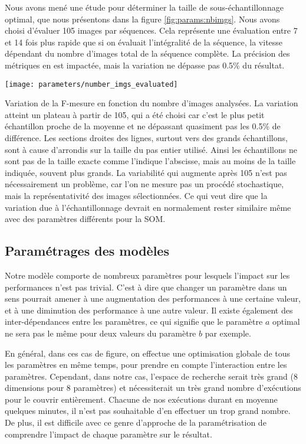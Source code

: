 	Nous avons mené une étude pour déterminer la taille de sous-échantillonnage optimal, que nous présentons dans la figure \ref{fig:params:nbimgs}. Nous avons choisi d'évaluer 105 images par séquences. Cela représente une évaluation entre 7 et 14 fois plus rapide que si on évaluait l'intégralité de la séquence, la vitesse dépendant du nombre d'images total de la séquence complète. La précision des métriques en est impactée, mais la variation ne dépasse pas 0.5\% du résultat.

	\begin{figureth}
		\texttt{[image: parameters/number\_imgs\_evaluated]}
		\caption[Échantillonnage de l'évaluation]{Variation de la F-mesure en fonction du nombre d'images analysées. La variation atteint un plateau à partir de 105, qui a été choisi car c'est le plus petit échantillon proche de la moyenne et ne dépassant quasiment pas les 0.5\% de différence. Les sections droites des lignes, surtout vers des grands échantillons, sont à cause d'arrondis sur la taille du pas entier utilisé. Ainsi les échantillons ne sont pas de la taille exacte comme l'indique l'abscisse, mais au moins de la taille indiquée, souvent plus grands. La variabilité qui augmente après 105 n'est pas nécessairement un problème, car l'on ne mesure pas un procédé stochastique, mais la représentativité des images sélectionnées. Ce qui veut dire que la variation due à l'échantillonnage devrait en normalement rester similaire même avec des paramètres différents pour la SOM.}\label{fig:params:nbimgs}
	\end{figureth}

	\subsection{Paramétrages des modèles}

	Notre modèle comporte de nombreux paramètres pour lesquels l'impact sur les performances n'est pas trivial. C'est à dire que changer un paramètre dans un sens pourrait amener à une augmentation des performances à une certaine valeur, et à une diminution des performance à une autre valeur. Il existe également des inter-dépendances entre les paramètres, ce qui signifie que le paramètre $a$ optimal ne sera pas le même pour deux valeurs du paramètre $b$ par exemple. 

	En général, dans ces cas de figure, on effectue une optimisation globale de tous les paramètres en même temps, pour prendre en compte l'interaction entre les paramètres. Cependant, dans notre cas, l'espace de recherche serait très grand (8 dimensions pour 8 paramètres) et nécessiterait un très grand nombre d'exécutions pour le couvrir entièrement. Chacune de nos exécutions durant en moyenne quelques minutes, il n'est pas souhaitable d'en effectuer un trop grand nombre. De plus, il est difficile avec ce genre d'approche de la paramétrisation de comprendre l'impact de chaque paramètre sur le résultat.

